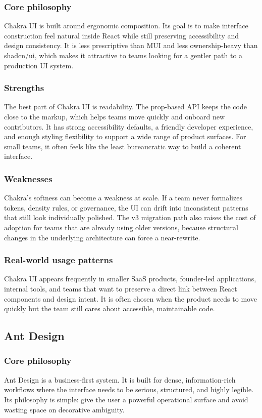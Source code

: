 \documentclass[11pt,twoside,a4paper]{article}
\begin{document}
\subsubsection{Core philosophy}
Chakra UI is built around ergonomic composition. Its goal is to make interface construction feel natural inside React while still preserving accessibility and design consistency. It is less prescriptive than MUI and less ownership-heavy than shadcn/ui, which makes it attractive to teams looking for a gentler path to a production UI system.

\subsubsection{Strengths}
The best part of Chakra UI is readability. The prop-based API keeps the code close to the markup, which helps teams move quickly and onboard new contributors. It has strong accessibility defaults, a friendly developer experience, and enough styling flexibility to support a wide range of product surfaces. For small teams, it often feels like the least bureaucratic way to build a coherent interface.

\subsubsection{Weaknesses}
Chakra's softness can become a weakness at scale. If a team never formalizes tokens, density rules, or governance, the UI can drift into inconsistent patterns that still look individually polished. The v3 migration path also raises the cost of adoption for teams that are already using older versions, because structural changes in the underlying architecture can force a near-rewrite.

\subsubsection{Real-world usage patterns}
Chakra UI appears frequently in smaller SaaS products, founder-led applications, internal tools, and teams that want to preserve a direct link between React components and design intent. It is often chosen when the product needs to move quickly but the team still cares about accessible, maintainable code.

\subsection{Ant Design}
\subsubsection{Core philosophy}
Ant Design is a business-first system. It is built for dense, information-rich workflows where the interface needs to be serious, structured, and highly legible. Its philosophy is simple: give the user a powerful operational surface and avoid wasting space on decorative ambiguity.
\end{document}
